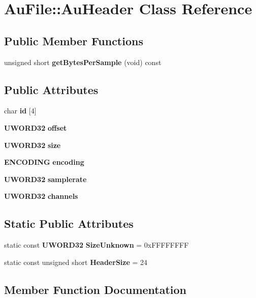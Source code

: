 \section{Au\+File\+:\+:Au\+Header Class Reference}
\label{classAuFile_1_1AuHeader}
\subsection*{Public Member Functions}
\begin{DoxyCompactItemize}
\item 
unsigned short \textbf{ get\+Bytes\+Per\+Sample} (void) const
\end{DoxyCompactItemize}
\subsection*{Public Attributes}
\begin{DoxyCompactItemize}
\item 
char \textbf{ id} [4]
\item 
\textbf{ U\+W\+O\+R\+D32} \textbf{ offset}
\item 
\textbf{ U\+W\+O\+R\+D32} \textbf{ size}
\item 
\textbf{ E\+N\+C\+O\+D\+I\+NG} \textbf{ encoding}
\item 
\textbf{ U\+W\+O\+R\+D32} \textbf{ samplerate}
\item 
\textbf{ U\+W\+O\+R\+D32} \textbf{ channels}
\end{DoxyCompactItemize}
\subsection*{Static Public Attributes}
\begin{DoxyCompactItemize}
\item 
static const \textbf{ U\+W\+O\+R\+D32} \textbf{ Size\+Unknown} = 0x\+F\+F\+F\+F\+F\+F\+FF
\item 
static const unsigned short \textbf{ Header\+Size} = 24
\end{DoxyCompactItemize}


\subsection{Member Function Documentation}
\mbox{\label{classAuFile_1_1AuHeader_a2282e7c4a6d8a3b5d3fa61ec9da8c3ce}} 
